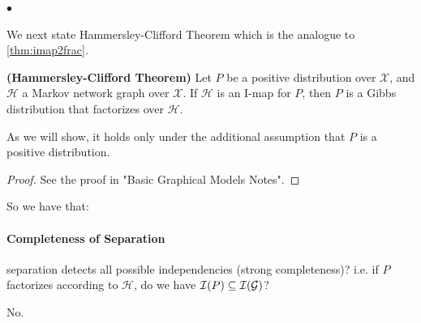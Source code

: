 \documentclass{article}
\newcommand{\bfs}[1]{\textbf{({#1}) }}
\begin{document}
$\bullet$ 

We next state Hammersley-Clifford Theorem which is the analogue to \cref{thm:imap2frac}.
\begin{thma}\bfs{Hammersley-Clifford Theorem}\label{thm:Hammersley}
Let $P$ be a positive distribution over $\mathcal{X}$, and $\mathcal{H}$ a Markov network graph over $\mathcal{X}$. If $\mathcal{H}$ is an I-map for $P$, then $P$ is a Gibbs distribution that factorizes over $\mathcal{H}$.
\end{thma}
\begin{rema}
As we will show, it holds only under the additional assumption that $P$ is a positive distribution.
\end{rema}
\begin{proof}
 See the proof in "Basic Graphical Models Notes".
\end{proof}

\begin{rema}
 So we have that:
 
 \centerline{}
\end{rema} 

\paragraph{Completeness of Separation}
 separation detects all possible independencies (strong completeness)? i.e. if $P$ factorizes according to $\mathcal{H}$, do we have $\mathcal{I}(P) \subseteq \mathcal{I}(\mathcal{G})$?

 No.
\end{document}
